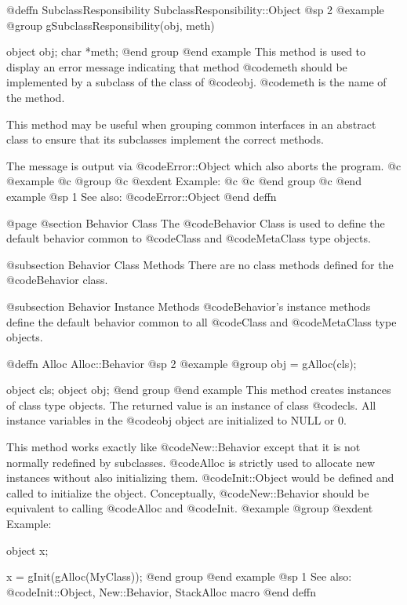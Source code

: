 @deffn {SubclassResponsibility} SubclassResponsibility::Object
@sp 2
@example
@group
gSubclassResponsibility(obj, meth)

object  obj;
char    *meth;
@end group
@end example
This method is used to display an error message indicating that method
@code{meth} should be implemented by a subclass of the class of
@code{obj}.  @code{meth} is the name of the method.

This method may be useful when grouping common interfaces in an
abstract class to ensure that its subclasses implement the correct
methods.

The message is output via @code{Error::Object} which also aborts the
program.
@c @example
@c @group
@c @exdent Example:
@c 
@c @end group
@c @end example
@sp 1
See also:  @code{Error::Object}
@end deffn










@page
@section Behavior Class
The @code{Behavior} Class is used to define the default behavior
common to @code{Class} and @code{MetaClass} type objects.

@subsection Behavior Class Methods
There are no class methods defined for the @code{Behavior} class.

@subsection Behavior Instance Methods
@code{Behavior}'s instance methods define the default behavior common to all
@code{Class} and @code{MetaClass} type objects.





@deffn {Alloc} Alloc::Behavior
@sp 2
@example
@group
obj = gAlloc(cls);

object  cls;
object  obj;
@end group
@end example
This method creates instances of class type objects.  The
returned value is an instance of class @code{cls}.  All instance
variables in the @code{obj} object are initialized to NULL or 0.

This method works exactly like @code{New::Behavior} except that it
is not normally redefined by subclasses.  @code{Alloc} is strictly
used to allocate new instances without also initializing them.
@code{Init::Object} would be defined and called to initialize the
object.  Conceptually, @code{New::Behavior} should be equivalent to
calling @code{Alloc} and @code{Init}.
@example
@group
@exdent Example:

object  x;

x = gInit(gAlloc(MyClass));
@end group
@end example
@sp 1
See also:  @code{Init::Object, New::Behavior, StackAlloc macro}
@end deffn






